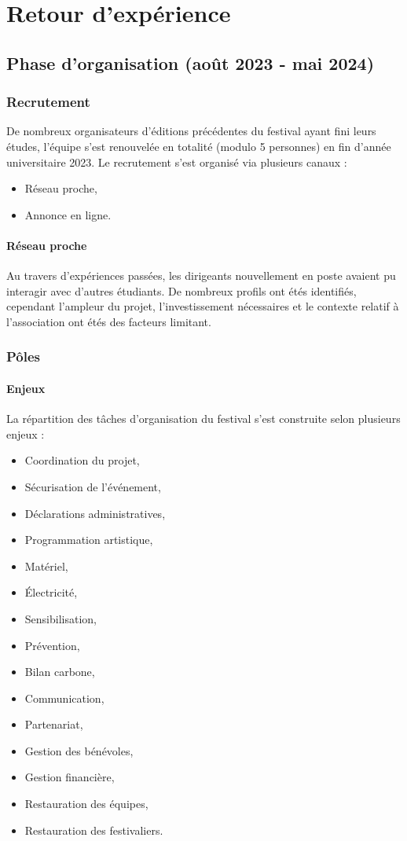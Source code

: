 \documentclass[12pt,a4paper]{report}
\begin{document}
\chapter{Retour d'expérience}

\section{Phase d'organisation (août 2023 - mai 2024)}
\subsection{Recrutement}
De nombreux organisateurs d'éditions précédentes du festival ayant fini leurs études, l'équipe  s'est renouvelée en totalité (modulo 5 personnes) en fin d'année universitaire 2023.
Le recrutement s'est organisé via plusieurs canaux : 
\begin{itemize}
\item Réseau proche,
\item Annonce en ligne.
\end{itemize}

\subsubsection{Réseau proche}
Au travers d'expériences passées, les dirigeants nouvellement en poste avaient pu interagir avec d'autres étudiants. De nombreux profils ont étés identifiés, cependant l'ampleur du projet, l'investissement nécessaires et le contexte relatif à l'association ont étés des facteurs limitant.

\subsection{Pôles}
\subsubsection{Enjeux}
La répartition des tâches d'organisation du festival s'est construite selon plusieurs enjeux :
\begin{itemize}
\item Coordination du projet,
\item Sécurisation de l'événement,
\item Déclarations administratives,
\item Programmation artistique,
\item Matériel,
\item Électricité,
\item Sensibilisation,
\item Prévention,
\item Bilan carbone,
\item Communication,
\item Partenariat,
\item Gestion des bénévoles,
\item Gestion financière,
\item Restauration des équipes,
\item Restauration des festivaliers. \\
\end{itemize}
\end{document}
